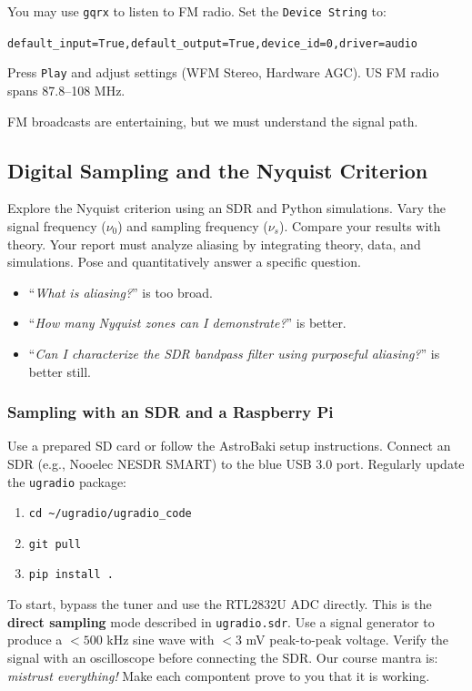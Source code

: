 \documentclass[11pt,preprint]{aastex}
\begin{document}
You may use {\tt gqrx} to listen to FM radio.
Set the {\tt Device String} to:

\noindent
{\tt default\_input=True,default\_output=True,device\_id=0,driver=audio}

\noindent
Press {\tt Play} and adjust settings (WFM Stereo, Hardware AGC).
US FM radio spans 87.8--108 MHz.

FM broadcasts are entertaining, but we must understand the signal path.


\subsection{Digital Sampling and the Nyquist Criterion}

\noindent
Explore the Nyquist criterion using an SDR and Python simulations.
Vary the signal frequency ($\nu_0$) and sampling frequency ($\nu_s$).
Compare your results with theory.
Your report must analyze aliasing by integrating theory, data, and simulations.
Pose and quantitatively answer a specific question.
\begin{itemize}
    \item ``{\it What is aliasing?}'' is too broad.
    \item ``{\it How many Nyquist zones can I demonstrate?}'' is better.
    \item ``{\it Can I characterize the SDR bandpass filter using purposeful aliasing?}''
is better still.
\end{itemize}

\subsubsection{Sampling with an SDR and a Raspberry Pi}

Use a prepared SD card or follow the AstroBaki setup instructions.
Connect an SDR (e.g., Nooelec NESDR SMART) to the blue USB 3.0 port.
Regularly update the {\tt ugradio} package:
\begin{enumerate}
    \item {\tt cd \textasciitilde/ugradio/ugradio\_code}
    \item {\tt git pull}
    \item {\tt pip install .}
\end{enumerate}

To start, bypass the tuner and use the RTL2832U ADC directly.
This is the {\bf direct sampling} mode described in {\tt ugradio.sdr}.
Use a signal generator to produce a $<500$ kHz sine wave with $<3$ mV
peak-to-peak voltage.
Verify the signal with an oscilloscope before connecting the SDR.
Our course mantra is: {\it mistrust everything!}
Make each compontent prove to you that it is working.
\end{document}
